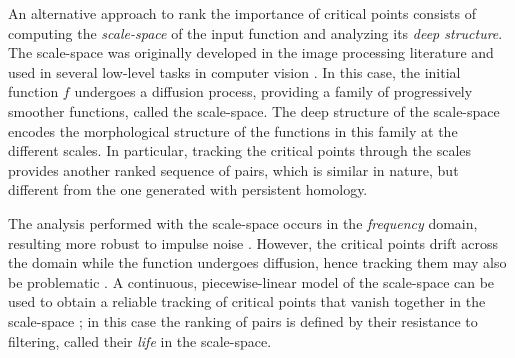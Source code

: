 An alternative approach to rank the importance of critical points consists of computing the \emph{scale-space} of the input function and analyzing its \emph{deep structure}. 
The scale-space was originally developed in the image processing literature and used in several low-level tasks in computer vision \cite{lindeberg94}. 
In this case, the initial function $f$ undergoes a diffusion process, providing a family of progressively smoother functions, called the scale-space.
The deep structure of the scale-space encodes the morphological structure of the functions in this family at the different scales. 
In particular, tracking the critical points through the scales provides another ranked sequence of pairs, which is similar in nature, but different from the one generated with persistent homology. 

The analysis performed with the scale-space occurs in the \emph{frequency} domain, resulting more robust to impulse noise \cite{Rocca23}. 
However, the critical points drift across the domain while the function undergoes diffusion, hence tracking them may also be problematic \cite{reininghaus11}. 
A continuous, piecewise-linear model of the scale-space can be used to obtain a reliable tracking of critical points that vanish together in the scale-space \cite{Rocca:2013}; in this case the ranking of pairs is defined by their resistance to filtering, called their \emph{life} in the scale-space. 


